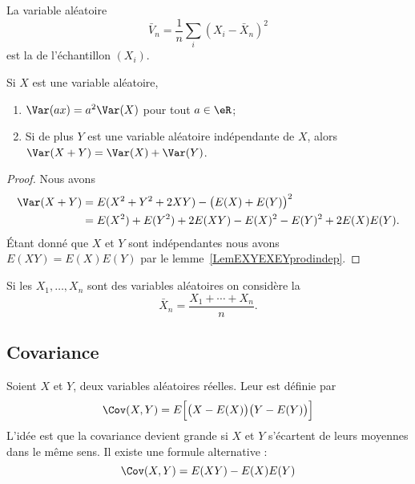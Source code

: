 La variable aléatoire
\begin{equation}
    \bar V_n=\frac{1}{ n }\sum_i(X_i-\bar X_n)^2
\end{equation}
est la  de l'échantillon \( (X_i)\).

\begin{lemma}       \label{LemEXYEXEYindep}\label{PropVarPropnnlin}
    Si \( X\) est une variable aléatoire,
    \begin{enumerate}
        \item
            $\Var(ax)=a^2\Var(X)$ pour tout \( a\in\eR\);
        \item
            Si de plus \( Y\) est une variable aléatoire indépendante de \( X\), alors $\Var(X+Y)=\Var(X)+\Var(Y)$.
    \end{enumerate}
\end{lemma}

\begin{proof}
    Nous avons
    \begin{subequations}
        \begin{align}
            \Var(X+Y)&=E(X^2+Y^2+2XY)-\big( E(X)+E(Y) \big)^2\\
            &=E(X^2)+E(Y^2)+2E(XY)-E(X)^2-E(Y)^2+2E(X)E(Y).
        \end{align}
    \end{subequations}
    Étant donné que \( X\) et \( Y\) sont indépendantes nous avons \( E(XY)=E(X)E(Y)\) par le lemme~\ref{LemEXYEXEYprodindep}.
\end{proof}

Si les \( X_1,\ldots,X_n\) sont des variables aléatoires on considère la 
\begin{equation}
    \bar X_n=\frac{ X_1+\cdots+X_n }{ n }.
\end{equation}

\subsection{Covariance}

Soient \( X\) et \( Y\), deux variables aléatoires réelles. Leur  est définie par
\begin{equation}    \label{EqHUWtttN}
    \Cov(X,Y)=E\Big[ \big( X-E(X) \big)\big( Y-E(Y) \big) \Big]
\end{equation}
L'idée est que la covariance devient grande si \( X\) et \( Y\) s'écartent de leurs moyennes dans le même sens. Il existe une formule alternative :
\begin{equation}
    \Cov(X,Y)=E(XY)-E(X)E(Y)
\end{equation}

